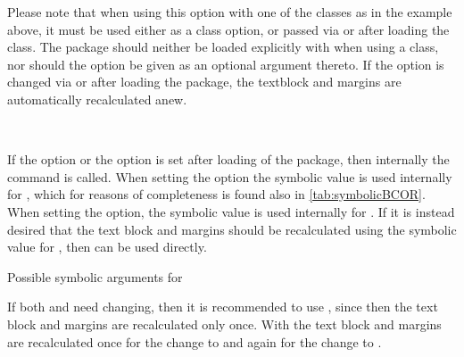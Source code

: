 Please note that when using this option with one of the {\KOMAScript}
classes as in the example above, it must be used either as a class
option, or passed via  or  after
loading the class. The  package should neither be
loaded explicitly with  when using a {\KOMAScript}
class, nor should the option be given as an optional argument
thereto. If the option is changed via  or
 after loading the package, the textblock and
margins are automatically recalculated anew.%
%
%
%

%
%
\begin{Declaration}
  \\
\end{Declaration}%
\begin{Explain}
  If the  option or the  option is set after
  loading of the  package, then internally the
  command  is called. When setting the 
  option the symbolic value  is used internally for
  , which for reasons of completeness is found also in
  \autoref{tab:symbolicBCOR}. When setting the  option,
  the symbolic value  is used internally for
  . If it is instead desired that the text block and
  margins should be recalculated using the symbolic value
   for , then
   can be used
  directly.
\end{Explain}

\begin{table}
  \caption[{Symoblic  arguments for
    }]{Possible symbolic  arguments for
    }
  \label{tab:symbolicBCOR}
  \begin{desctabular}
  \end{desctabular}
\end{table}

If both  and  need changing, then it is
recommended to use , since then the text block and
margins are recalculated only once. With
 the text block and margins are
recalculated once for the change to  and again for the
change to .

